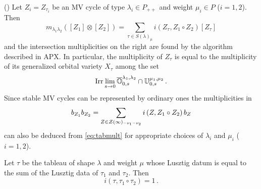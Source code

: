 \documentclass[draft]{article}
\begin{document}
\begin{proposition}(\cite{baumann2019mirkovic})
    Let $Z_{i} = Z_{\tau_i}$  be an MV cycle of type $\lambda_i\in P_{++}$ and weight $\mu_i\in P$ ($i = 1,2$). Then 
    \begin{equation}
        m_{\lambda_1\lambda_2} ([Z_1]\otimes[Z_2]) 
        = 
        \sum_{\tau\in S(\lambda)_\mu}
        i\left(
            Z_\tau, Z_1\circ Z_2 
        \right) [Z_\tau]
    \end{equation}
    and the intersection multiplicities on the right are found by the algorithm described in APX.
    In particular, 
    the multiplicity of $Z_\tau$
    is equal to the multiplicity of its generalized orbital variety $X_\tau$ among the set 
    \begin{equation}\label{eq:tabmult}
        \operatorname{Irr}\lim_{s\to 0} \overline{\mathbb O}^{\lambda_1,\lambda_2}_{0,s}\cap\mathbb U^{\mu_1,\mu_2}_{0,s} \,. 
    \end{equation}
    Since stable MV cycles can be represented by ordinary ones the multiplicities in 
    $$
    b_{Z_1}b_{Z_2} = \sum_{Z\in\mathcal Z(\infty)_{-\nu_1 - \nu_2}} i \left(
        Z, Z_1 \circ Z_2 
    \right) b_Z 
    $$
    can also be deduced from \cref{eq:tabmult} for appropriate choices of $\lambda_i$ and $\mu_i$ ($i = 1,2$).
\end{proposition}

\begin{conjecture}
    Let $\tau$ be the tableau of shape $\lambda$ and weight $\mu$ whose Lusztig datum is equal to the sum of the Lusztig data of $\tau_1$ and $\tau_2$. 
    Then 
    \begin{equation}
        i(\tau, 
        \tau_1 \circ \tau_2 
        ) = 1 \,. 
    \end{equation}
\end{conjecture}
\end{document}
